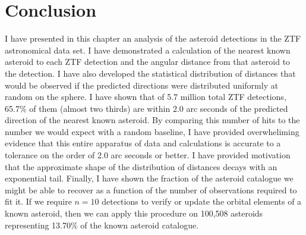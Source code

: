 \section{Conclusion}
\label{section_ztf_conclusion}
I have presented in this chapter an analysis of the asteroid detections in the ZTF astronomical data set.
I have demonstrated a calculation of the nearest known asteroid to each ZTF detection 
and the angular distance from that asteroid to the detection.
I have also developed the statistical distribution of distances that would be observed 
if the predicted directions were distributed uniformly at random on the sphere.
I have shown that of 5.7 million total ZTF detections, 65.7\% of them (almost two thirds)
are within 2.0 arc seconds of the predicted direction of the nearest known asteroid.
By comparing this number of hits to the number we would expect with a random baseline,
I have provided overwheliming evidence that this entire apparatus of data and calculations is accurate 
to a tolerance on the order of 2.0 arc seconds or better.
I have provided motivation that the approximate shape of the distribution of distances decays with an exponential tail.
Finally, I have shown the fraction of the asteroid catalogue we might be able to recover as a function of the number of observations required to fit it.  
If we require $n=10$ detections to verify or update the orbital elements of a known asteroid,
then we can apply this procedure on 100,508 asteroids representing 13.70\% of the known asteroid catalogue.